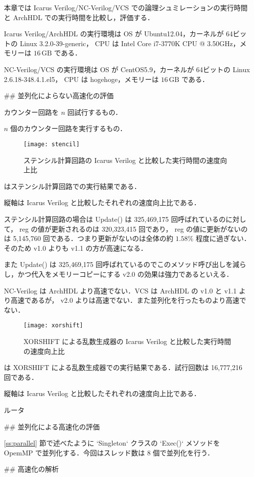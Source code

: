 本章では Icarus Verilog/NC-Verilog/VCS での論理シュミレーションの実行時間と
ArchHDL での実行時間を比較し，評価する．

Icarus Verilog/ArchHDL の実行環境は OS が Ubuntu12.04，カーネルが 64ビットの
Linux 3.2.0-39-generic， CPU は
Intel Core i7-3770K CPU @ 3.50GHz，メモリーは
$16\,\mathrm{GB}$ である．

NC-Verilog/VCS の実行環境は OS が CentOS5.9，カーネルが 64ビットの
Linux 2.6.18-348.4.1.el5， CPU は
hogehoge，メモリーは
$16\,\mathrm{GB}$ である．


## 並列化によらない高速化の評価

カウンター回路を $n$ 回試行するもの．

$n$ 個のカウンター回路を実行するもの．

\begin{figure}[t]
 \centering
 \texttt{[image: stencil]}
 \caption{ステンシル計算回路の Icarus Verilog と比較した実行時間の速度向上比}
 \label{fig:stencil}
\end{figure}

 はステンシル計算回路での実行結果である．

縦軸は Icarus Verilog と比較したそれぞれの速度向上比である．

ステンシル計算回路の場合は Update() は 325,469,175 回呼ばれているのに対して，
reg の値が更新されるのは 320,323,415 回であり，
reg の値に更新がないのは 5,145,760 回である．つまり更新がないのは全体の約
$1.58\%$ 程度に過ぎない．そのため v1.0 よりも v1.1 の方が高速になる．

また Update() は 325,469,175 回呼ばれているのでこのメソッド呼び出しを減らし，かつ代入をメモリーコピーにする v2.0 の効果は強力であるといえる．

NC-Verilog は ArchHDL より高速でない．VCS は ArchHDL の v1.0 と v1.1 より高速であるが， v2.0 よりは高速でない．また並列化を行ったものより高速でない．

\begin{figure}[t]
 \centering
 \texttt{[image: xorshift]}
 \caption{XORSHIFT による乱数生成器の Icarus Verilog と比較した実行時間の速度向上比}
 \label{fig:xorshift}
\end{figure}

 は XORSHIFT による乱数生成器での実行結果である．試行回数は 16,777,216 回である．

縦軸は Icarus Verilog と比較したそれぞれの速度向上比である．






ルータ





## 並列化による高速化の評価

\ref{ss:parallel} 節で述べたように `Singleton` クラスの `Exec()`
メソッドを OpemMP で並列化する．今回はスレッド数は 8 個で並列化を行う．







## 高速化の解析







